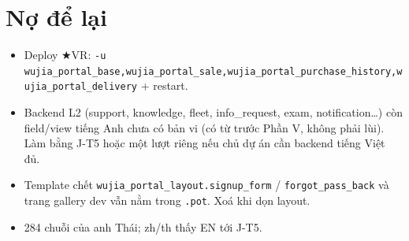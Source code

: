 \section{Nợ để lại}

\begin{itemize}[nosep]
\item Deploy ★VR: \texttt{-u wujia\_portal\_base,wujia\_portal\_sale,wujia\_portal\_purchase\_history,wujia\_portal\_delivery} + restart.
\item Backend L2 (support, knowledge, fleet, info\_request, exam, notification\ldots) còn field/view tiếng Anh chưa có bản vi (có từ
  trước Phần V, không phải lùi). Làm bằng J-T5 hoặc một lượt riêng nếu chủ dự án cần backend tiếng Việt đủ.
\item Template chết \texttt{wujia\_portal\_layout.signup\_form} / \texttt{forgot\_pass\_back} và trang gallery dev vẫn nằm trong
  \texttt{.pot}. Xoá khi dọn layout.
\item 284 chuỗi của anh Thái; zh/th thấy EN tới J-T5.
\end{itemize}

